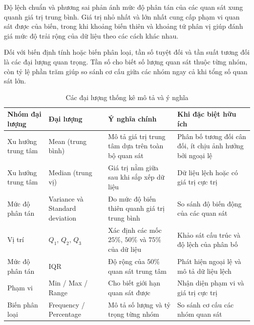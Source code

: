 \documentclass[../main.tex]{subfiles}
\begin{document}
Độ lệch chuẩn và phương sai phản ánh mức độ phân tán của các quan sát xung quanh giá trị trung bình. Giá trị nhỏ nhất và lớn nhất cung cấp phạm vi quan sát được của biến, trong khi khoảng biến thiên và khoảng tứ phân vị giúp đánh giá mức độ trải rộng của dữ liệu theo các cách khác nhau.

Đối với biến định tính hoặc biến phân loại, tần số tuyệt đối và tần suất tương đối là các đại lượng quan trọng. Tần số cho biết số lượng quan sát thuộc từng nhóm, còn tỷ lệ phần trăm giúp so sánh cơ cấu giữa các nhóm ngay cả khi tổng số quan sát lớn.

\begin{table}[H]
    \centering
    \caption{Các đại lượng thống kê mô tả và ý nghĩa}
    \label{tab:t1:measures}
    \renewcommand{\arraystretch}{1.2}
    \begin{tabularx}{\textwidth}{|p{}|p{}|p{}|X|}
        \hline
        \textbf{Nhóm đại lượng} &
        \textbf{Đại lượng} &
        \textbf{Ý nghĩa chính} &
        \textbf{Khi đặc biệt hữu ích} \\
        \hline

        Xu hướng trung tâm &
        Mean (trung bình) &
        Mô tả giá trị trung tâm dựa trên toàn bộ quan sát &
        Phân bố tương đối cân đối, ít chịu ảnh hưởng bởi ngoại lệ \\
        \hline

        Xu hướng trung tâm &
        Median (trung vị) &
        Giá trị nằm giữa sau khi sắp xếp dữ liệu &
        Dữ liệu lệch hoặc có giá trị cực trị \\
        \hline

        Mức độ phân tán &
        Variance và Standard deviation &
        Đo mức độ biến thiên quanh giá trị trung bình &
        So sánh độ biến động của các quan sát \\
        \hline

        Vị trí &
        $Q_1$, $Q_2$, $Q_3$ &
        Xác định các mốc $25\%$, $50\%$ và $75\%$ của dữ liệu &
        Khảo sát cấu trúc và độ lệch của phân bố \\
        \hline

        Mức độ phân tán &
        IQR &
        Độ rộng của $50\%$ quan sát trung tâm &
        Phát hiện ngoại lệ và mô tả dữ liệu lệch \\
        \hline

        Phạm vi &
        Min / Max / Range &
        Cho biết giới hạn quan sát được &
        Nhận diện phạm vi và giá trị cực trị \\
        \hline

        Biến phân loại &
        Frequency / Percentage &
        Mô tả số lượng và tỷ trọng từng nhóm &
        So sánh cơ cấu các nhóm quan sát \\
        \hline
    \end{tabularx}
\end{table}
\end{document}
